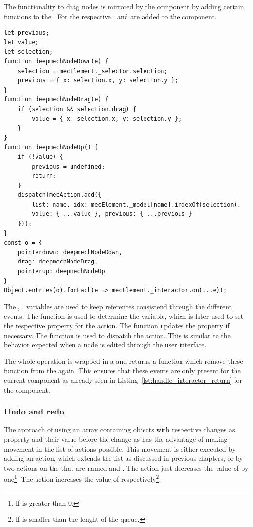 The functionality to drag nodes is mirrored by the  component by adding certain functions to the .
For the respective ,  and  are added to the  component.

\begin{lstlisting}[label={lst:bidirectional_node_update}, caption={Adding functions to \code{mecElement.\_interactor} to work bidirectional.}]
let previous;
let value;
let selection;
function deepmechNodeDown(e) {
    selection = mecElement._selector.selection;
    previous = { x: selection.x, y: selection.y };
}
function deepmechNodeDrag(e) {
    if (selection && selection.drag) {
        value = { x: selection.x, y: selection.y };
    }
}
function deepmechNodeUp() {
    if (!value) {
        previous = undefined;
        return;
    }
    dispatch(mecAction.add({
        list: name, idx: mecElement._model[name].indexOf(selection),
        value: { ...value }, previous: { ...previous }
    }));
}
const o = {
    pointerdown: deepmechNodeDown,
    drag: deepmechNodeDrag,
    pointerup: deepmechNodeUp
}
Object.entries(o).forEach(e => mecElement._interactor.on(...e));
\end{lstlisting}

The , ,  variables are used to keep references consistend through the different events.
The  function is used to determine the  variable, which is later used to set the respective property for the action.
The  function updates the  property if necessary.
The  function is used to dispatch the action.
This is similar to the behavior expected when a node is edited through the user interface.

The whole operation is wrapped in a  and returns a function which remove these function from the  again.
This ensures that these events are only present for the current  component as already seen in Listing~\ref{lst:handle_interactor_return} for the  component.

\subsubsection{Undo and redo}\label{ch:undo_redo}

The approach of using an array containing objects with respective changes as  property and their value before the change as  has the advantage of making movement in the list of actions possible.
This movement is either executed by adding an action, which extends the list as discussed in previous chapters, or by two actions on the  that are named  and .
The  action just decreases the value of  by one\footnote{If  is greater than 0.}.
The  action increases the value of  respectively\footnote{If  is smaller than the lenght of the queue.}.

